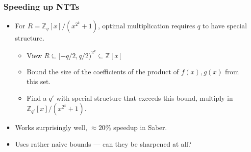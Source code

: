 \documentclass{beamer}
\theoremstyle{definition}
\begin{document}

\begin{frame}
	\frametitle{Speeding up NTTs \cite{NTTmult}}
	\begin{itemize}
		\item For $R = \mathbb{Z}_q[x] / (x^{2^k}+1)$, \alert{optimal multiplication} requires $q$ to have \alert{special structure}.\pause
		\begin{itemize}
			\item View $R \subseteq [-q/2, q/2)^{2^k}\subseteq \mathbb{Z}[x]$\pause
			\item Bound the size of the coefficients of the product of $f(x), g(x)$ from this set.\pause 
			\item Find a $q'$ with \alert{special structure} that exceeds this bound, multiply in $\mathbb{Z}_{q'}[x]/(x^{2^k}+1)$.\pause
		\end{itemize}
	\item Works surprisingly well, $\approx 20\%$ speedup in Saber.\pause
	\item Uses rather naive bounds --- can they be sharpened at all?
	\end{itemize}
	
\end{frame}
\end{document}
